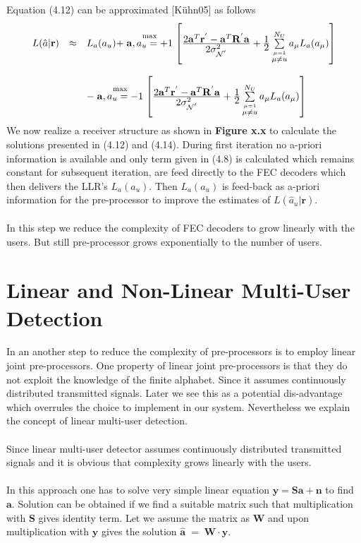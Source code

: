 Equation (4.12) can be approximated [K\"uhn05] as follows
\begin{eqnarray}
\begin{array}{lll}
L(\hat{a}\vert \mathrm{\mathbf{r}})&\approx& L_a(a_u)
+\stackrel{\mathrm{max}}{\mathrm{\mathbf{a}},a_u=+1}\left[ \frac{\hbox{$2\mathrm{\mathbf{a}}^T\mathrm{\mathbf{r}}^{'}-\mathrm{\mathbf{a}}^T\mathrm{\mathbf{R}}^{'}\mathrm{\mathbf{a}}$}}{\hbox{$2\sigma^2_{\mathcal{N}^{'}}$}}+\frac{\hbox{$1$}}{\hbox{$2$}} \sum\limits_{\stackrel{\mu=1}{\mu \ne u}}^{N_U}a_{\mu}L_a(a_\mu) \right] \\ \\
&&-\stackrel{\mathrm{max}}{\mathrm{\mathbf{a}},a_u=-1}\left[ \frac{\hbox{$2\mathrm{\mathbf{a}}^T\mathrm{\mathbf{r}}^{'}-\mathrm{\mathbf{a}}^T\mathrm{\mathbf{R}}^{'}\mathrm{\mathbf{a}}$}}{\hbox{$2\sigma^2_{\mathcal{N}^{'}}$}}+\frac{\hbox{$1$}}{\hbox{$2$}} \sum\limits_{\stackrel{\mu=1}{\mu \ne u}}^{N_U}a_{\mu}L_a(a_\mu) \right]
\end{array}
\end{eqnarray}
We now realize a receiver structure as shown in \textbf{Figure x.x} to calculate the solutions presented in (4.12) and (4.14). During first iteration no a-priori information is available and only term given in (4.8) is calculated which remains constant for subsequent iteration, are feed directly to the FEC decoders which then delivers the LLR's $L_a(a_u)$. Then $L_a(a_u)$ is feed-back as a-priori information for the pre-processor to improve the estimates of $L(\hat{a}_u\vert \mathrm{\mathbf{r}})$. \\ \\
In this step we reduce the complexity of FEC decoders to grow linearly with the users. But still pre-processor grows exponentially to the number of users.
\section{Linear and Non-Linear Multi-User Detection}
In an another step to reduce the complexity of pre-processors is to employ linear joint pre-processors. One property of linear joint pre-processors is that they do not exploit the knowledge of the finite alphabet. Since it assumes continuously distributed transmitted signals. Later we see this as a potential dis-advantage which overrules the choice to implement in our system. Nevertheless we explain the concept of linear multi-user detection. \\ \\
Since linear multi-user detector assumes continuously distributed transmitted signals and it is obvious that complexity grows linearly with the users. \\ \\
In this approach one has to solve very simple linear equation $\mathrm{\mathbf{y}}=\mathrm{\mathbf{S}}\mathrm{\mathbf{a}}+\mathrm{\mathbf{n}}$ to find $\mathrm{\mathbf{a}}$. Solution can be obtained if we find a suitable matrix such that multiplication with $\mathrm{\mathbf{S}}$ gives identity term. Let we assume the matrix as $\mathrm{\mathbf{W}}$ and upon multiplication with $\mathrm{\mathbf{y}}$ gives the solution $\mathrm{\mathbf{\hat{a}}}\;=\;\mathrm{\mathbf{W}}\cdot\mathrm{\mathbf{y}}$.
